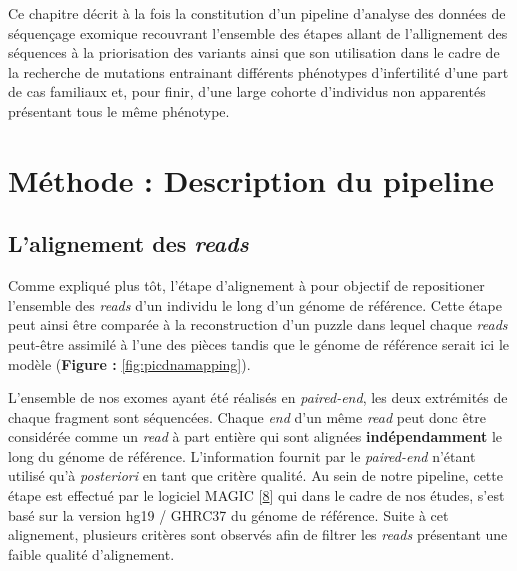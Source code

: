 \documentclass[12pt,twoside]{reedthesis}
\theoremstyle{definition}
\theoremstyle{definition}
\theoremstyle{remark}
\begin{document}
  Ce chapitre décrit à la fois la constitution d'un pipeline d'analyse des
  données de séquençage exomique recouvrant l'ensemble des étapes allant
  de l'allignement des séquences à la priorisation des variants ainsi que
  son utilisation dans le cadre de la recherche de mutations entrainant
  différents phénotypes d'infertilité d'une part de cas familiaux et, pour
  finir, d'une large cohorte d'individus non apparentés présentant tous le
  même phénotype.
  
  \newpage
  
  \section{Méthode : Description du
  pipeline}\label{methode-description-du-pipeline}
  
  \subsection{\texorpdfstring{L'alignement des
  \emph{reads}}{L'alignement des reads}}\label{lalignement-des-reads}
  
  Comme expliqué plus tôt, l'étape d'alignement à pour objectif de
  repositioner l'ensemble des \emph{reads} d'un individu le long d'un
  génome de référence. Cette étape peut ainsi être comparée à la
  reconstruction d'un puzzle dans lequel chaque \emph{reads} peut-être
  assimilé à l'une des pièces tandis que le génome de référence serait ici
  le modèle (\textbf{Figure : }\ref{fig:picdnamapping}).
  
  L'ensemble de nos exomes ayant été réalisés en \emph{paired-end}, les
  deux extrémités de chaque fragment sont séquencées. Chaque \emph{end}
  d'un même \emph{read} peut donc être considérée comme un \emph{read} à
  part entière qui sont alignées \textbf{indépendamment} le long du génome
  de référence. L'information fournit par le \emph{paired-end} n'étant
  utilisé qu'à \emph{posteriori} en tant que critère qualité. Au sein de
  notre pipeline, cette étape est effectué par le logiciel MAGIC
  {[}\protect\hyperlink{ref-Su2014}{8}{]} qui dans le cadre de nos études,
  s'est basé sur la version hg19 / GHRC37 du génome de référence. Suite à
  cet alignement, plusieurs critères sont observés afin de filtrer les
  \emph{reads} présentant une faible qualité d'alignement.
  
\end{document}
